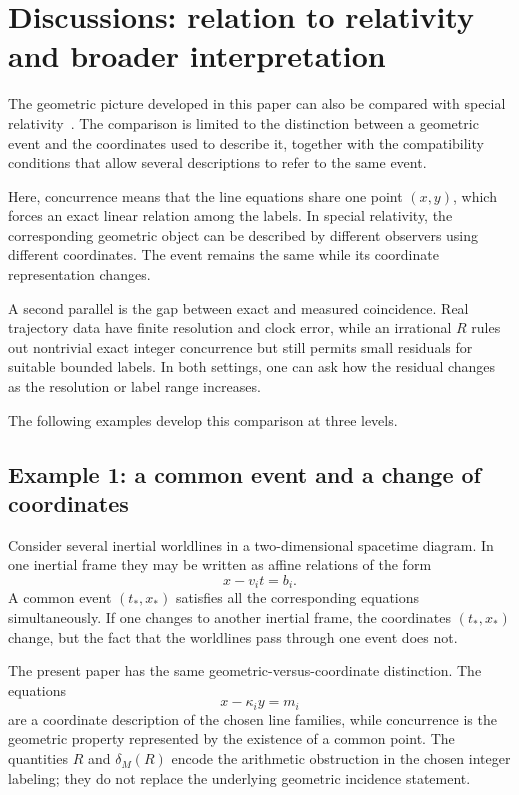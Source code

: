 \documentclass[11pt,a4paper]{article}
\begin{document}
\section{Discussions: relation to relativity and broader interpretation}
The geometric picture developed in this paper can also be compared with special relativity~\cite{einstein1905,schutz2009}. The comparison is limited to the distinction between a geometric event and the coordinates used to describe it, together with the compatibility conditions that allow several descriptions to refer to the same event.

Here, concurrence means that the line equations share one point $(x,y)$, which forces an exact linear relation among the labels. In special relativity, the corresponding geometric object can be described by different observers using different coordinates. The event remains the same while its coordinate representation changes.

A second parallel is the gap between exact and measured coincidence. Real trajectory data have finite resolution and clock error, while an irrational $R$ rules out nontrivial exact integer concurrence but still permits small residuals for suitable bounded labels. In both settings, one can ask how the residual changes as the resolution or label range increases.

The following examples develop this comparison at three levels.

\subsection{Example 1: a common event and a change of coordinates}
Consider several inertial worldlines in a two-dimensional spacetime diagram. In one inertial frame they
may be written as affine relations of the form
\[
x-v_i t=b_i.
\]
A common event $(t_*,x_*)$ satisfies all the corresponding equations simultaneously. If one changes to
another inertial frame, the coordinates $(t_*,x_*)$ change, but the fact that the worldlines pass through
one event does not.

The present paper has the same geometric-versus-coordinate distinction. The equations
\[
x-\kappa_i y=m_i
\]
are a coordinate description of the chosen line families, while concurrence is the geometric property
represented by the existence of a common point. The quantities $R$ and $\delta_M(R)$ encode the
arithmetic obstruction in the chosen integer labeling; they do not replace the underlying geometric
incidence statement.
\end{document}
